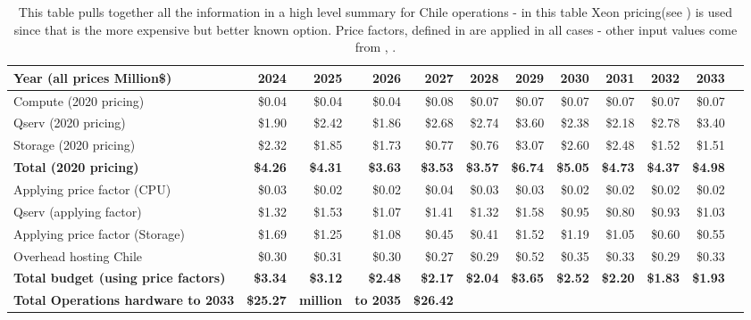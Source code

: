 \tiny \begin{longtable} { |p{}  |r  |r  |r  |r  |r  |r  |r  |r  |r  |r  |r |} 
\caption{This table pulls together all the information in a high level summary for Chile operations - in this table Xeon pricing(see ) is used since that is the more expensive but better known option. Price factors, defined in  are applied in all cases - other input values come from , .
 \label{tab:opsSumChile}}\\ 
\hline 
\textbf{Year  (all prices Million\$)}&\textbf{2024}&\textbf{2025}&\textbf{2026}&\textbf{2027}&\textbf{2028}&\textbf{2029}&\textbf{2030}&\textbf{2031}&\textbf{2032}&\textbf{2033} \\ \hline
{Compute (2020 pricing)}&{\$0.04}&{\$0.04}&{\$0.04}&{\$0.08}&{\$0.07}&{\$0.07}&{\$0.07}&{\$0.07}&{\$0.07}&{\$0.07} \\ \hline
{Qserv (2020 pricing)}&{\$1.90}&{\$2.42}&{\$1.86}&{\$2.68}&{\$2.74}&{\$3.60}&{\$2.38}&{\$2.18}&{\$2.78}&{\$3.40} \\ \hline
{Storage (2020 pricing)}&{\$2.32}&{\$1.85}&{\$1.73}&{\$0.77}&{\$0.76}&{\$3.07}&{\$2.60}&{\$2.48}&{\$1.52}&{\$1.51} \\ \hline
\textbf{Total (2020 pricing)}&\textbf{\$4.26}&\textbf{\$4.31}&\textbf{\$3.63}&\textbf{\$3.53}&\textbf{\$3.57}&\textbf{\$6.74}&\textbf{\$5.05}&\textbf{\$4.73}&\textbf{\$4.37}&\textbf{\$4.98} \\ \hline
{Applying price factor (CPU)}&{\$0.03}&{\$0.02}&{\$0.02}&{\$0.04}&{\$0.03}&{\$0.03}&{\$0.02}&{\$0.02}&{\$0.02}&{\$0.02} \\ \hline
{Qserv (applying factor)}&{\$1.32}&{\$1.53}&{\$1.07}&{\$1.41}&{\$1.32}&{\$1.58}&{\$0.95}&{\$0.80}&{\$0.93}&{\$1.03} \\ \hline
{Applying price factor (Storage)}&{\$1.69}&{\$1.25}&{\$1.08}&{\$0.45}&{\$0.41}&{\$1.52}&{\$1.19}&{\$1.05}&{\$0.60}&{\$0.55} \\ \hline
{Overhead hosting Chile}&{\$0.30}&{\$0.31}&{\$0.30}&{\$0.27}&{\$0.29}&{\$0.52}&{\$0.35}&{\$0.33}&{\$0.29}&{\$0.33} \\ \hline
\textbf{Total budget (using price factors)}&\textbf{\$3.34}&\textbf{\$3.12}&\textbf{\$2.48}&\textbf{\$2.17}&\textbf{\$2.04}&\textbf{\$3.65}&\textbf{\$2.52}&\textbf{\$2.20}&\textbf{\$1.83}&\textbf{\$1.93} \\ \hline
\textbf{Total Operations hardware to 2033}&\textbf{\$25.27}&\textbf{million}&\textbf{to 2035}&\textbf{\$26.42}&&&&&& \\ \hline
\end{longtable} \normalsize
